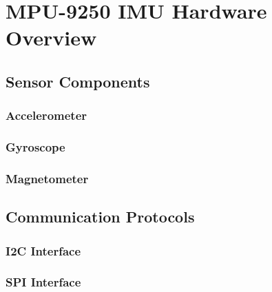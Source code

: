 \section{MPU-9250 IMU Hardware Overview}
    \subsection{Sensor Components}
        \subsubsection{Accelerometer}
        \subsubsection{Gyroscope}
        \subsubsection{Magnetometer}
    
    \subsection{Communication Protocols}
        \subsubsection{I2C Interface}
        \subsubsection{SPI Interface}
